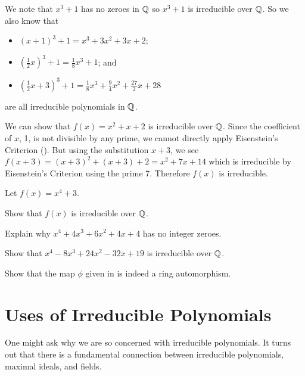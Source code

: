 \begin{example}
    We note that $x^3 + 1$ has no zeroes in $\mathbb{Q}$ so $x^3 + 1$ is irreducible over $\mathbb{Q}$. So we also know that
    \begin{itemize}
        \item $(x+1)^3 + 1 = x^3 + 3x^2 + 3x + 2$;
        \item $(\frac12x)^3 + 1 = \frac18x^3 + 1$; and
        \item $(\frac12x + 3)^3 + 1 = \frac18x^3 + \frac94x^2 + \frac{27}2x + 28$
    \end{itemize}
    are all irreducible polynomials in $\mathbb{Q}$.
\end{example}

\begin{example}
    We can show that $f(x) = x^2 + x + 2$ is irreducible over $\mathbb{Q}$. Since the coefficient of $x$, 1, is not divisible by any prime, we cannot directly apply Eisenstein's Criterion (). But using the substitution $x + 3$, we see $f(x+3) = (x+3)^2 + (x+3) + 2 = x^2 + 7x + 14$ which is irreducible by Eisenstein's Criterion using the prime 7. Therefore $f(x)$ is irreducible.
\end{example}

\begin{exercise}
    Let $f(x) = x^4 + 3$.
    \begin{partquestions}{\roman*}
        \item Show that $f(x)$ is irreducible over $\mathbb{Q}$.
        \item Explain why $x^4 + 4x^3 + 6x^2 + 4x + 4$ has no integer zeroes.
        \item Show that $x^4 - 8x^3 + 24x^2 - 32x + 19$ is irreducible over $\mathbb{Q}$.
    \end{partquestions}
\end{exercise}

\begin{exercise}\label{exercise-substitution-by-constant-factor-multiple-map}
    Show that the map $\phi$ given in  is indeed a ring automorphism.
\end{exercise}

\section{Uses of Irreducible Polynomials}
One might ask why we are so concerned with irreducible polynomials. It turns out that there is a fundamental connection between irreducible polynomials, maximal ideals, and fields.

